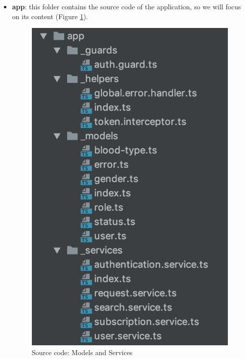 \documentclass[a4paper, hidelinks, 12pt]{report}
\begin{document}
	\begin{itemize}
		\item \textbf{app}: this folder contains the source code of the application, so we will focus on its content (Figure \ref{fig:d4h_source_code_models_services}).

	\begin{figure}[H]
		\centering
		\includegraphics[scale=0.6]{images/frontend/d4h_source_code_models_services.png}
		\caption[Source code: Models and Services]{Source code: Models and Services}
		\label{fig:d4h_source_code_models_services}
	\end{figure}


\end{itemize}
\end{document}
